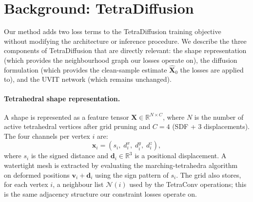 \documentclass[10pt, a4paper, twocolumn]{article}
\begin{document}
\section{Background: TetraDiffusion}
\label{sec:background}

Our method adds two loss terms to the TetraDiffusion training objective~\cite{kalischek2022tetradiffusion} without modifying the architecture or inference procedure. We describe the three components of TetraDiffusion that are directly relevant: the shape representation (which provides the neighbourhood graph our losses operate on), the diffusion formulation (which provides the clean-sample estimate $\hat{\mathbf{X}}_0$ the losses are applied to), and the UVIT network (which remains unchanged).

\paragraph{Tetrahedral shape representation.}
A shape is represented as a feature tensor $\mathbf{X} \in \mathbb{R}^{N \times C}$, where $N$ is the number of active tetrahedral vertices after grid pruning and $C = 4$ (SDF + 3 displacements). The four channels per vertex $i$ are:
\begin{equation}
    \mathbf{x}_i = (s_i,\; d_i^x,\; d_i^y,\; d_i^z),
\end{equation}
where $s_i$ is the signed distance and $\mathbf{d}_i \in \mathbb{R}^3$ is a positional displacement. A watertight mesh is extracted by evaluating the marching-tetrahedra algorithm~\cite{shen2021dmtet} on deformed positions $\mathbf{v}_i + \mathbf{d}_i$ using the sign pattern of $s_i$. The grid also stores, for each vertex $i$, a neighbour list $\mathcal{N}(i)$ used by the TetraConv operations; this is the same adjacency structure our constraint losses operate on.
\end{document}

